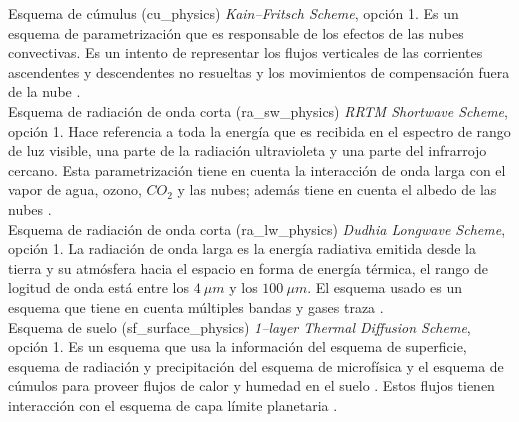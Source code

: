 Esquema de cúmulus (cu\_physics) \textit{Kain–Fritsch Scheme}, opción 1. Es un esquema de parametrización que es responsable de los efectos de las nubes convectivas. Es un intento de representar los flujos verticales de las corrientes ascendentes y descendentes no resueltas y los movimientos de compensación fuera de la nube \citep{ArmentaPorras2013}.\\

Esquema de radiación de onda corta (ra\_sw\_physics) \textit{RRTM Shortwave Scheme}, opción 1. Hace referencia a toda la energía que es recibida en el espectro de rango de luz visible, una parte de la radiación ultravioleta y una parte del infrarrojo cercano. Esta parametrización tiene en cuenta la interacción de onda larga con el vapor de agua, ozono, $CO_2$ y las nubes; además tiene en cuenta el albedo de las nubes \citep{Armstrong2000}.\\

Esquema de radiación de onda corta (ra\_lw\_physics) \textit{Dudhia Longwave Scheme}, opción 1. La radiación de onda larga es la energía radiativa emitida desde la tierra y su atmósfera hacia el espacio en forma de energía térmica, el rango de logitud de onda está entre los $4\ \mu m$ y los $100\ \mu m$. El esquema usado es un esquema que tiene en cuenta múltiples bandas y gases traza \citep{ArmentaPorras2013}.\\

Esquema de suelo (sf\_surface\_physics) \textit{1–layer Thermal Diffusion Scheme}, opción 1. Es un esquema que usa la información del esquema de superficie, esquema de radiación y precipitación del esquema de microfísica y el esquema de cúmulos para proveer flujos de calor y humedad en el suelo \citep{Skamarock2008}. Estos flujos tienen interacción con el esquema de capa límite planetaria \citep{shuman1978numerical}. \\

